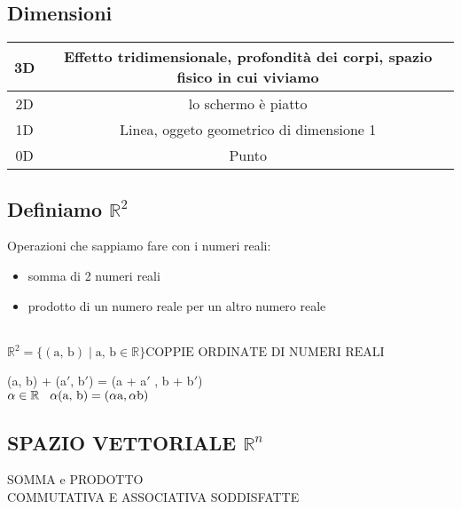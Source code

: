 \subsection{Dimensioni}

\begin{tabular}{|c|c|}
	\hline
	3D & Effetto tridimensionale, profondità dei corpi, spazio fisico in cui viviamo \\
	\hline
	2D & lo schermo è piatto \\
	\hline
	1D & Linea, oggeto geometrico di dimensione 1 \\
	\hline
	0D & Punto \\
	\hline
\end{tabular}

\subsection{Definiamo $\mathbb{R}^2$}

\textsf{\small Operazioni che sappiamo fare con i numeri reali:} \\
\begin{itemize}
	\item \textsf{\small somma di 2 numeri reali}
	\item \textsf{\small prodotto di un numero reale per un altro numero reale}
\end{itemize}

 \\
\centering
\(
\mathbb{R}^2 = \{(\text{a, b}) \mid \text{a, b} \in \mathbb{R} \} \text{COPPIE ORDINATE DI NUMERI REALI}
\)

\textsf{\small {} (a, b) + (a$'$, b$'$) = (a + a$'$ , b + b$'$)} \\
\textsf{ $\alpha \in \mathbb{R} \hspace{0.3cm} \alpha(\text{a, b}) = (\alpha \text{a}, \alpha \text{b})$} \\


\subsection{SPAZIO VETTORIALE $\mathbb{R}^n$}

\textsf{\small SOMMA e PRODOTTO} \\
\textsf{\small COMMUTATIVA E ASSOCIATIVA SODDISFATTE} \\

